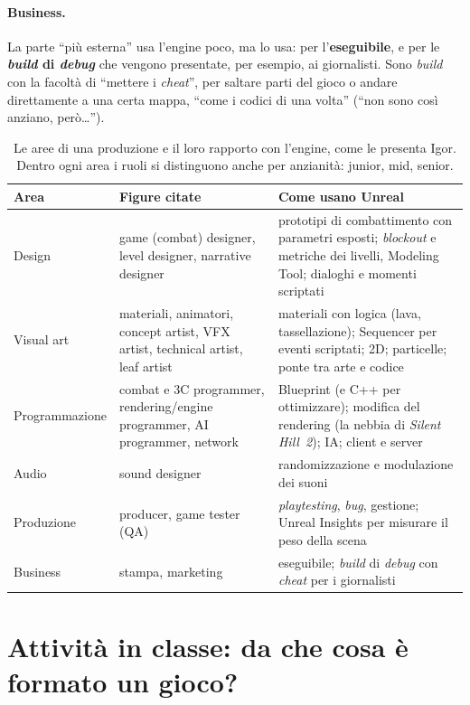 \paragraph{Business.} La parte ``più esterna'' usa l'engine poco, ma lo usa: per
l'\textbf{eseguibile}, e per le \textbf{\emph{build} di \emph{debug}} che vengono
presentate, per esempio, ai giornalisti. Sono \emph{build} con la facoltà di ``mettere i
\emph{cheat}'', per saltare parti del gioco o andare direttamente a una certa mappa,
``come i codici di una volta'' (``non sono così anziano, però\ldots'').

\begin{table}[htbp]
\centering
\small
\begin{tabular}{@{}p{2.3cm}p{4.2cm}p{6.6cm}@{}}
\toprule
\textbf{Area} & \textbf{Figure citate} & \textbf{Come usano Unreal} \\
\midrule
Design & game (combat) designer, level designer, narrative designer &
  prototipi di combattimento con parametri esposti; \emph{blockout} e metriche dei
  livelli, Modeling Tool; dialoghi e momenti scriptati \\
Visual art & materiali, animatori, concept artist, VFX artist, technical artist, leaf
  artist & materiali con logica (lava, tassellazione); Sequencer per eventi
  scriptati; 2D; particelle; ponte tra arte e codice \\
Programmazione & combat e 3C programmer, rendering/engine programmer, AI programmer,
  network & Blueprint (e C++ per ottimizzare); modifica del rendering (la nebbia di
  \emph{Silent Hill~2}); IA; client e server \\
Audio & sound designer & randomizzazione e modulazione dei suoni \\
Produzione & producer, game tester (QA) & \emph{playtesting}, \emph{bug},
  gestione; Unreal Insights per misurare il peso della scena \\
Business & stampa, marketing & eseguibile; \emph{build} di \emph{debug} con
  \emph{cheat} per i giornalisti \\
\bottomrule
\end{tabular}
\caption{Le aree di una produzione e il loro rapporto con l'engine, come le presenta
Igor. Dentro ogni area i ruoli si distinguono anche per anzianità: junior, mid,
senior.}
\label{ue1:tab:ruoli}
\end{table}

\section{Attività in classe: da che cosa è formato un gioco?}
\label{ue1:sec:elementi}

